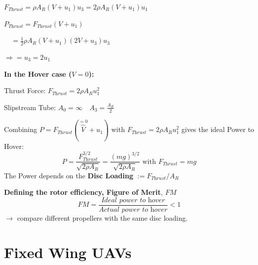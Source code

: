 \documentclass[fontsize=6pt,DIV=calc,a4paper,ngerman]{scrartcl}
\begin{document}
\begin{multicols*}{4}
\begin{minipage}{0.6\linewidth}
		\smallskip
		$F_{\textit{Thrust}}
			= \rho A_R(V+u_1)u_3
			= 2\rho A_R(V+u_1)u_1 $

		$P_{\textit{Thrust}} = F_{\textit{Thrust}}(V+u_1) $

		$\quad= \frac{1}{2}\rho A_R(V+u_1)(2V+u_3)u_3$

		$\Rightarrow = u_3 = 2u_1$

		\smallskip
		\textbf{In the Hover case ($V=0$):}

		Thrust Force: $F_{\textit{Thrust}} = 2\rho A_Ru_1^2$

		Slipstream Tube: $A_0 = \infty \quad A_3 = \frac{A_R}{2}$
	\end{minipage}
    
	Combining $P=F_{\textit{Thrust}}(\overbrace{V}^{=0}+u_1)$ with $F_{\textit{Thrust}}=2\rho A_Ru_1^2$ gives the ideal Power to Hover:
	$$P=\frac{F_{\textit{Thrust}}^{3/2}}{\sqrt{2\rho A_R}} = \frac{(mg)^{3/2}}{\sqrt{2\rho A_R}} \text{ with } F_{\textit{Thrust}} = mg$$
	The Power depends on the \textbf{Disc Loading} $:=F_{\textit{Thrust}}/A_R$

	\smallskip
	\textbf{Defining the rotor efficiency, Figure of Merit}, $FM$\\
	$$FM = \frac{\textit{Ideal power to hover}}{\textit{Actual power to hover}}<1$$
	$\rightarrow$ compare different propellers with the same disc loading.

	\section{Fixed Wing UAVs}

\end{multicols*}
\end{document}
